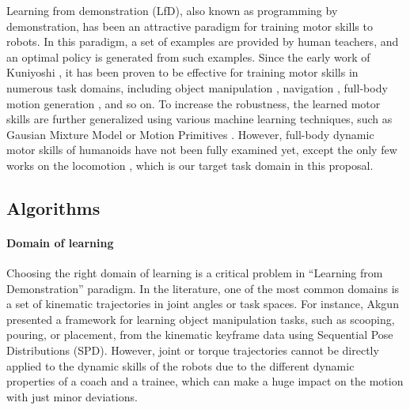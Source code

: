 Learning from demonstration (LfD), also known as programming by demonstration,
has been an attractive paradigm for training motor skills to robots.
In this paradigm, a set of examples are provided by human teachers,
and an optimal policy is generated from such examples.
Since the early work of Kuniyoshi \etal \cite{kuniyoshi:1989:TBS},
it has been proven to be effective for training motor skills in
numerous task domains, including object manipulation 
\cite{Atkeson:1997:RLD,Calinon:2007:LRG,Ueda:2010:MNH},
navigation \cite{Konidaris:2011:RLD}, 
full-body motion generation \cite{Kulic:2011:ILF}, and so on.
To increase the robustness, the learned motor skills are further 
generalized using various machine learning techniques,
such as Gausian Mixture Model \cite{Calinon:2007:LRG} or
Motion Primitives \cite{Pastor:2009:LGM}.
However, full-body dynamic motor skills of humanoids have
not been fully examined yet, except the only few works on the
locomotion \cite{Nakanishi:2004:LDA},
which is our target task domain in this proposal.

\subsection{Algorithms}

\paragraph{Domain of learning}

Choosing the right domain of learning is a critical problem 
in ``Learning from Demonstration'' paradigm.
In the literature, one of the most common domains is a set of kinematic
trajectories in joint angles or task spaces.
For instance, Akgun \etal \cite{Akgun:2011:KLD} presented a framework
for learning object manipulation tasks, such as scooping, pouring, or 
placement, from the kinematic keyframe data using 
Sequential Pose Distributions (SPD).
However, joint or torque trajectories cannot be directly applied to the
dynamic skills of the robots  due to the different dynamic properties 
of a coach and a trainee, which can make a huge impact on the motion
with just minor deviations.

